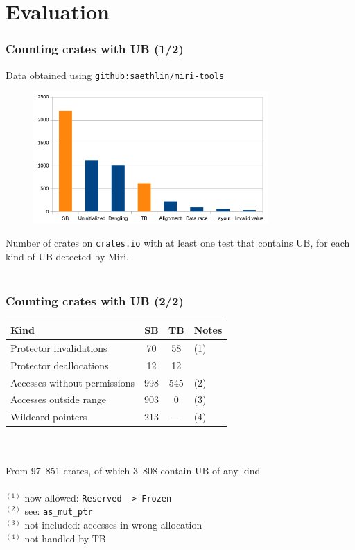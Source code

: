 \section{Evaluation}

\begin{frame}
    \frametitle{Counting crates with UB (1/2)}
    {\footnotesize
    Data obtained using \href{https://github.com/saethlin/miri-tools}{\texttt{github:saethlin/miri-tools}}\\
    }
    \begin{figure}
        \includegraphics[width=0.8\textwidth]{../img/ub-count.png}
    \end{figure}
    {\footnotesize Number of crates on \texttt{crates.io} with at least one test
    that contains UB, for each kind of UB detected by Miri.}\\~\\
\end{frame}

\begin{frame}
    \frametitle{Counting crates with UB (2/2)}
    \begin{tabular}{|l|c|c|l|}
        \hline
        Kind                         &  SB &  TB & Notes\\
        \hline
        Protector invalidations      &  70 &  58 & \tiny(1) \\
        Protector deallocations      &  12 &  12 & \\
        Accesses without permissions & 998 & 545 & \tiny(2) \\
        Accesses outside range       & 903 &   0 & \tiny(3) \\
        Wildcard pointers            & 213 & --- & \tiny(4) \\
        \hline
    \end{tabular}~\\~\\
    From 97~851 crates, of which 3~808 contain UB of any kind\\~\\

    {\footnotesize
    \(^{(1)}\) now allowed: \texttt{Reserved -> Frozen}\\
    \(^{(2)}\) see: \texttt{as\_mut\_ptr}\\
    \(^{(3)}\) not included: accesses in wrong allocation\\
    \(^{(4)}\) not handled by TB\\
    }
\end{frame}

